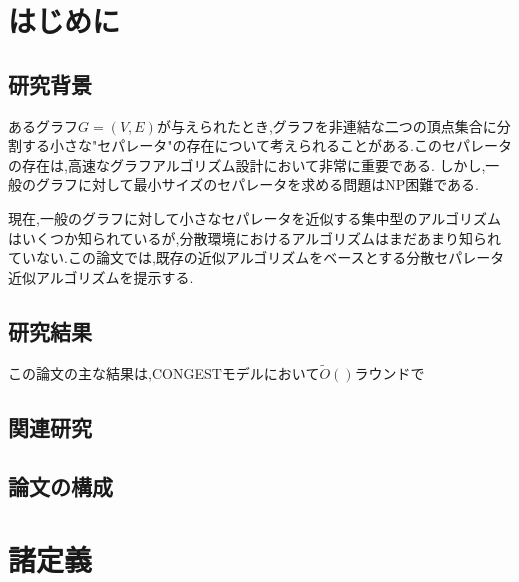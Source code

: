 \documentclass{thesis}
\theoremstyle{definition}
\begin{document}
\baselineskip=22pt
\pagestyle{empty}

\maketitle

\pagestyle{myheadings}	%
\tableofcontents

\newpage


\chapter{はじめに}

\section{研究背景}

あるグラフ$G=(V,E)$が与えられたとき,グラフを非連結な二つの頂点集合に分割する小さな"セパレータ"の存在について考えられることがある.このセパレータの存在は,高速なグラフアルゴリズム設計において非常に重要である.
しかし,一般のグラフに対して最小サイズのセパレータを求める問題はNP困難である.\par
現在,一般のグラフに対して小さなセパレータを近似する集中型のアルゴリズムはいくつか知られているが,分散環境におけるアルゴリズムはまだあまり知られていない.この論文では,既存の近似アルゴリズムをベースとする分散セパレータ近似アルゴリズムを提示する.

\section{研究結果}
この論文の主な結果は,CONGESTモデルにおいて$\tilde{O}()$ラウンドで

\section{関連研究}

\section{論文の構成}


\chapter{諸定義}
\end{document}
